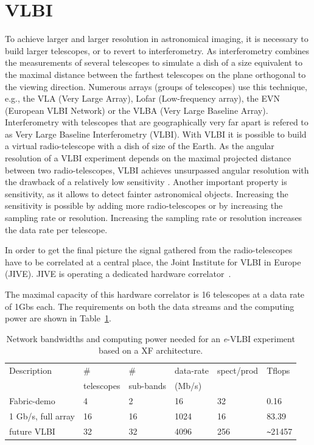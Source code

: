 \section{VLBI}\label{sec:vlbi}
To achieve larger and larger resolution in astronomical imaging, it is
necessary to build larger telescopes, or to revert to
interferometry. As interferometry combines the measurements of several
telescopes to simulate a dish of a size equivalent to the maximal
distance between the farthest telescopes on the plane orthogonal to
the viewing direction. Numerous arrays (groups of telescopes) use this
technique, e.g., the VLA (Very Large Array), Lofar (Low-frequency
array), the EVN (European VLBI Network) or the VLBA (Very Large
Baseline Array).  Interferometry with telescopes that are
geographically very far apart is refered to as Very Large Baseline
Interferometry (VLBI). With VLBI it is possible to build a virtual
radio-telescope with a dish of size of the Earth. As the angular
resolution of a VLBI experiment depends on the maximal projected
distance between two radio-telescopes, VLBI achieves unsurpassed
angular resolution with the drawback of a relatively low sensitivity
\cite{VLBIbook}. Another important property is
sensitivity, as it allows to detect fainter astronomical
objects. Increasing the sensitivity is possible by adding more
radio-telescopes or by increasing the sampling rate or
resolution. Increasing the sampling rate or resolution increases the
data rate per telescope.

In order to get the final picture the signal gathered from the
radio-telescopes have to be correlated at a central place, the Joint
Institute for VLBI in Europe (JIVE).  JIVE is
operating a dedicated hardware correlator~\cite{EVNCorrelator}.

The maximal capacity of this hardware correlator is 16 telescopes at a
data rate of 1Gbs each. The requirements on both the data streams and
the computing power are shown in Table~\ref{tab:speed}.

\begin{table}
  \centering
  \begin{tabular}[c]{|l|l|l|l|l|l|}
    \hline
    Description & \# & \#  & data-rate & spect/prod & Tflops\\
    & telescopes & sub-bands & (Mb/s) &  & \\
    \hline
    \hline
    Fabric-demo &4 &2 &16 &32 &0.16\\
    1 Gb/s, full array  &16 &16 &1024 &16 &83.39\\
    future VLBI &32 &32 &4096 &256 &\verb|~|21457\\
    \hline
  \end{tabular}
  \caption{Network bandwidths and computing power needed for an {\it e}-VLBI
    experiment based on a XF architecture.}
  \label{tab:speed}
\end{table}

